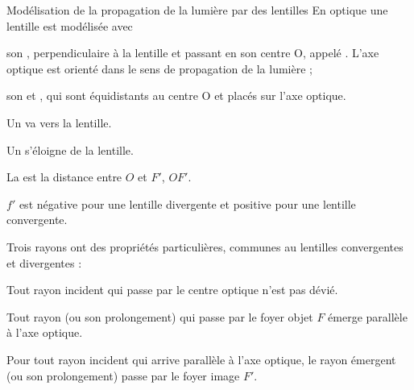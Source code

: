 \begin{doc}{Modélisation de la propagation de la lumière par des lentilles}
  En optique une lentille est modélisée avec
  \begin{listePoints}
    \item son , perpendiculaire à la lentille et passant en son centre O, appelé . L'axe optique est orienté dans le sens de propagation de la lumière ;
    \item son  et , qui sont équidistants au centre O et placés sur l'axe optique.
  \end{listePoints}

  \begin{boite}
    \vspace{-4pt}
    \vspace{-8pt}
    \begin{importants}
      \begin{listePoints}
        \item Un  va vers la lentille.
        \item Un  s'éloigne de la lentille.
        \item La  est la distance entre $O$ et $F'$, $OF'$.
      \end{listePoints}
    \end{importants}
    \vspace{-4pt}
    
    $f'$ est négative pour une lentille divergente et positive pour une lentille convergente.
  \end{boite}    

  Trois rayons ont des propriétés particulières, communes au lentilles convergentes et divergentes :
  
  \begin{listePoints}
    \item Tout rayon incident qui passe par le centre optique n'est pas dévié.
    \begin{center}
    \end{center}
  
    \item Tout rayon (ou son prolongement) qui passe par le foyer objet $F$ émerge parallèle à l'axe optique.
    \begin{center}
    \end{center}
  
    \item Pour tout rayon incident qui arrive parallèle à l'axe optique, le rayon émergent (ou son prolongement) passe par le foyer image $F'$.
    \begin{center}
    \end{center}
  \end{listePoints}
\end{doc}

